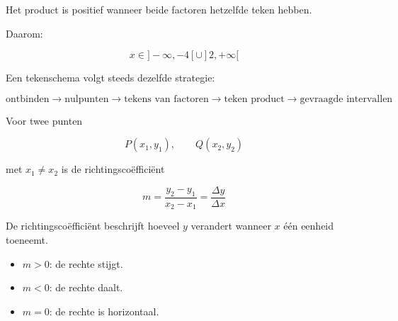 \documentclass{ximera}
\begin{document}
Het product is positief wanneer beide factoren hetzelfde teken hebben.

Daarom:

\[
\boxed{
x\in]-\infty,-4[\cup]2,+\infty[
}
\]


\begin{opmerking}
Een tekenschema volgt steeds dezelfde strategie:

\[
\boxed{
\text{ontbinden}
\rightarrow
\text{nulpunten}
\rightarrow
\text{tekens van factoren}
\rightarrow
\text{teken product}
\rightarrow
\text{gevraagde intervallen}
}
\]
\end{opmerking}






Voor twee punten

\[
P(x_1,y_1),
\qquad
Q(x_2,y_2)
\]

met \(x_1\neq x_2\) is de richtingscoëfficiënt

\[
\boxed{
m=\frac{y_2-y_1}{x_2-x_1}
=
\frac{\Delta y}{\Delta x}
}
\]

De richtingscoëfficiënt beschrijft hoeveel \(y\) verandert wanneer \(x\) één eenheid toeneemt.

\begin{itemize}
\item \(m>0\): de rechte stijgt.
\item \(m<0\): de rechte daalt.
\item \(m=0\): de rechte is horizontaal.
\end{itemize}


\begin{center}
\end{center}
\end{document}
